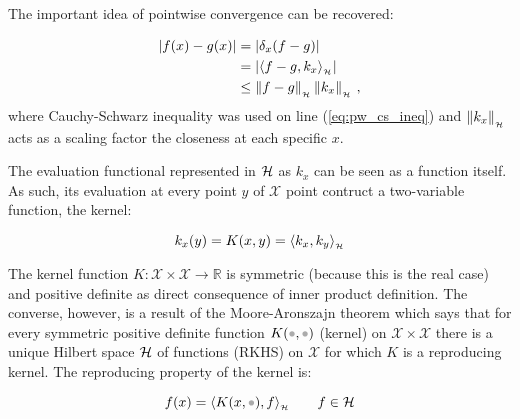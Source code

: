 The important idea of pointwise convergence can be recovered:

\begin{subequations}
\begin{align}
\left|f(x)-g(x)\right| &= \left|\delta_x(f-g)\right|\\
			  &= \left|\langle f-g,k_x\rangle_{_{\mathcal{H}}}\right|\\
			  &\leq \left\lVert f-g\right\rVert_{_{\mathcal{H}}}\left\lVert k_x\right\rVert_{_{\mathcal{H}}}\label{eq:pw_cs_ineq}\,,
\end{align}
\end{subequations}
%
where Cauchy-Schwarz inequality was used on line (\ref{eq:pw_cs_ineq}) and
\(\left\lVert k_x\right\rVert_{_{\mathcal{H}}}\) acts as a scaling factor the closeness at each specific $x$.

The evaluation functional represented in $\mathcal{H}$ as $k_x$ can be seen as a
function itself. As such, its evaluation at every point $y$ of $\mathcal{X}$
point contruct a two-variable function, the kernel:

\begin{equation}
k_x(y) = K(x,y) = \langle k_x,k_y\rangle_{_{\mathcal{H}}}
\end{equation}

The kernel function \(K:\mathcal{X}\times\mathcal{X}\to\mathbb{R}\) is
symmetric (because this is the real case) and positive definite as direct consequence of
inner product definition. The converse, however, is a result of the
Moore-Aronszajn theorem which says that for every symmetric positive definite
function $K(\parm,\parm)$ (kernel) on \(\mathcal{X}\times\mathcal{X}\) there is a unique
Hilbert space $\mathcal{H}$ of functions (RKHS) on \(\mathcal{X}\) for which $K$ is a
reproducing kernel. The reproducing property of the kernel is:

\begin{equation}
f(x) = \hip{K(x,\parm)}{f} \qquad f \in \hs
\end{equation}

